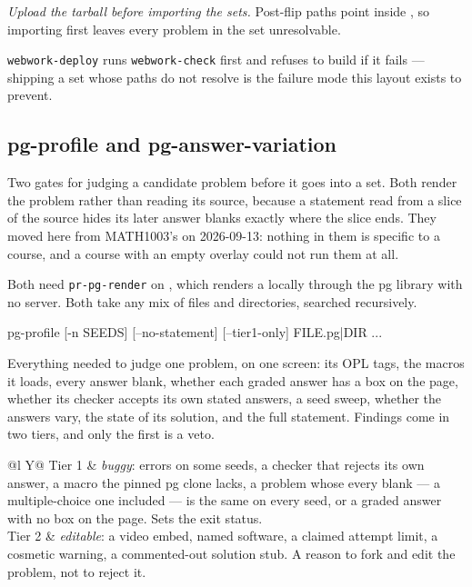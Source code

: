 \emph{Upload the tarball before importing the sets.} Post-flip paths point
inside , so importing first leaves every problem in
the set unresolvable.

\texttt{webwork-deploy} runs \texttt{webwork-check} first and refuses to build
if it fails --- shipping a set whose paths do not resolve is the failure mode
this layout exists to prevent.

\subsection*{pg-profile and pg-answer-variation}

Two gates for judging a candidate problem before it goes into a set.
Both render the problem rather than reading its source, because a statement read from a slice of the source hides its later answer blanks exactly where the slice ends.
They moved here from MATH1003's  on 2026-09-13: nothing in them is specific to a course, and a course with an empty overlay could not run them at all.

Both need \texttt{pr-pg-render} on , which renders a  locally through the pg library with no server.
Both take any mix of  files and directories, searched recursively.

\begin{manexsource}
pg-profile [-n SEEDS] [--no-statement] [--tier1-only] FILE.pg|DIR ...
\end{manexsource}

Everything needed to judge one problem, on one screen: its OPL tags, the macros it loads, every answer blank, whether each graded answer has a box on the page, whether its checker accepts its own stated answers, a seed sweep, whether the answers vary, the state of its solution, and the full statement.
Findings come in two tiers, and only the first is a veto.

\begin{center}
\begin{tabularx}{\linewidth}{@{}l Y@{}}
Tier 1 & \emph{buggy}: errors on some seeds, a checker that rejects its own
  answer, a macro the pinned pg clone lacks, a problem whose every blank ---
  a multiple-choice one included --- is the same on every seed, or a graded
  answer with no box on the page. Sets the exit status.\\
Tier 2 & \emph{editable}: a video embed, named software, a claimed attempt
  limit, a cosmetic warning, a commented-out solution stub. A reason to fork and
  edit the problem, not to reject it.\\
\end{tabularx}
\end{center}

